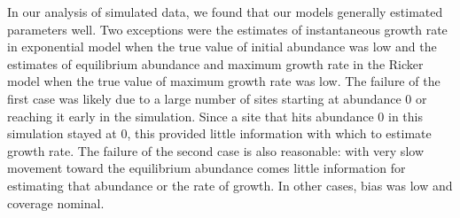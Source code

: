 \documentclass[12pt]{article}
\begin{document}

In our analysis of simulated data, we found that our models generally estimated parameters well.
Two exceptions were the estimates of instantaneous growth rate in exponential model when the 
true value of initial abundance was low and the estimates of equilibrium abundance and maximum
growth rate in the Ricker model when the true value of maximum growth rate was low.  
The failure of the first case was likely due to a large number of sites starting at abundance 0 or reaching it early in the simulation.  
Since a site that hits abundance 0 in this simulation stayed at 0, this provided little information with
which to estimate growth rate.  The failure of the second case is also reasonable: with very
slow movement toward the equilibrium abundance comes little information for estimating
that abundance or the rate of growth.  In other cases, bias was low and coverage nominal.
\end{document}
